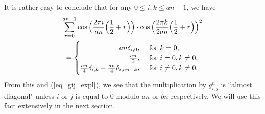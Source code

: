 \documentclass[12pt]{article}
\numberwithin{equation}{section}
\theoremstyle{theorem}
\theoremstyle{definition}
\theoremstyle{remark}
\begin{document}
		It is rather easy to conclude that for any $0 \leq i, k \leq an - 1$, we have
		\begin{multline}\label{eq_sum_prod_cos}
			\sum_{r = 0}^{an - 1} 
			\cos \Big( \frac{2 \pi i}{a n} \Big( \frac{1}{2} + r \Big) \Big)
			\cdot
			\cos \Big( \frac{2 \pi k}{2a n} \Big( \frac{1}{2} + r \Big) \Big)^2
			\\
			=
			\begin{cases} 
				\hfill an \delta_{i, 0}, & \text{ for } k = 0, \\
				\hfill \frac{an}{2},  & \text{ for } i = 0, k \neq 0, \\
				\hfill \frac{an}{4} \delta_{i, k} - \frac{an}{4} \delta_{i, an - k}, & \text{ for } i \neq 0, k \neq 0.\\
 			\end{cases}
		\end{multline}
		From this and (\ref{eq_gij_expl}), we see that the multiplication by $g^{n}_{i, j}$ is “almost diagonal" unless $i$ or $j$ is equal to $0$ modulo $an$ or $bn$ respectively.
		We will use this fact extensively in the next section.
		
		
\end{document}
